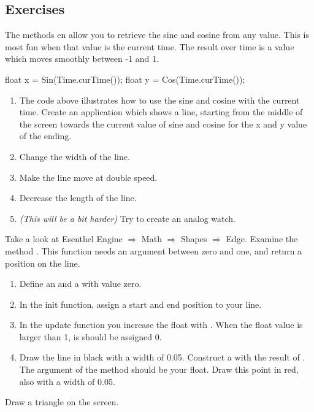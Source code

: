 \subsection{Exercises}

The methods  en  allow you to retrieve the sine and cosine from any value. This is most fun when that value is the current time. The result over time is a value which moves smoothly between -1 and 1.

\begin{code}
float x = Sin(Time.curTime());
float y = Cos(Time.curTime());
\end{code}

\begin{enumerate}
\item The code above illustrates how to use the sine and cosine with the current time. Create an application which shows a line, starting from the middle of the screen towards the current value of sine and cosine for the x and y value of the ending.
\item Change the width of the line.
\item Make the line move at double speed.
\item Decrease the length of the line. 
\item \textit{(This will be a bit harder)} Try to create an analog watch.
\end{enumerate}

Take a look at Esenthel Engine $\Rightarrow$ Math $\Rightarrow$ Shapes $\Rightarrow$ Edge. Examine the method . This function needs an argument between zero and one, and return a position on the line.

\begin{enumerate}
\item Define an  and a  with value zero.
\item In the init function, assign a start and end position to your line.
\item In the update function you increase the float with . When the float value is larger than 1, is should be assigned 0.
\item Draw the line in black with a width of 0.05. Construct a  with the result of . The argument of the method should be your float. Draw this point in red, also with a width of 0.05.
\end{enumerate}

Draw a triangle on the screen.

